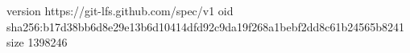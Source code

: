version https://git-lfs.github.com/spec/v1
oid sha256:b17d38bb6d8e29e13b6d10414dfd92c9da19f268a1bebf2dd8c61b24565b8241
size 1398246
